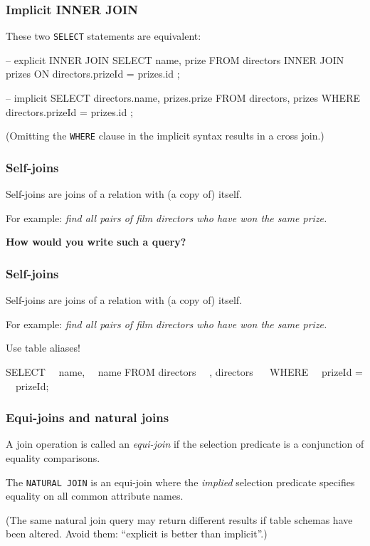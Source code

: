 \documentclass[english,serif,mathserif]{beamer}
\begin{document}
\begin{frame}[fragile]
  \frametitle{Implicit INNER JOIN}

  These two \texttt{SELECT} statements are equivalent:

  \+
  \begin{sql}
-- explicit INNER JOIN
SELECT name, prize
FROM directors INNER JOIN prizes
ON directors.prizeId = prizes.id ;
    \end{sql}

  \+
  \begin{sql}
-- implicit
SELECT directors.name, prizes.prize
FROM directors, prizes
WHERE directors.prizeId = prizes.id ;
\end{sql}

  \+
  (Omitting the \texttt{WHERE} clause in the implicit syntax results in a cross join.)
\end{frame}

\begin{frame}[fragile]
  \frametitle{Self-joins}
  Self-joins are joins of a relation with (a copy of) itself.

  \+
  For example: \emph{find all pairs of film directors who have won the same prize.}

  \+
  \textbf{How would you write such a query?}
\end{frame}


\begin{frame}[fragile]
  \frametitle{Self-joins}
  Self-joins are joins of a relation with (a copy of) itself.

  \+
  For example: \emph{find all pairs of film directors who have won the same prize.}

  \+
  \alert{Use table aliases!}

  \+
\begin{sql}
SELECT ~~name, ~~name
FROM directors ~~, directors ~~
WHERE ~~prizeId = ~~prizeId;
  \end{sql}
\end{frame}


\begin{frame}
  \frametitle{Equi-joins and natural joins}

  A join operation is called an \emph{equi-join} if the selection predicate is a
  conjunction of equality comparisons.

  \+ The \texttt{NATURAL JOIN} is an equi-join where the \emph{implied}
  selection predicate specifies equality on all common attribute names.

  \+ (The same natural join query may return different results if table schemas
  have been altered. Avoid them: ``explicit is better than implicit''.)
\end{frame}
\end{document}
